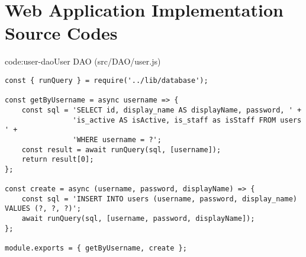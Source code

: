 \section{Web Application Implementation Source Codes}\label{sect:web-application-implementation-source-codes}

\begin{codeenv}{code:user-dao}{User DAO (src/DAO/user.js)}\begin{verbatim}
const { runQuery } = require('../lib/database');

const getByUsername = async username => {
    const sql = 'SELECT id, display_name AS displayName, password, ' +
                'is_active AS isActive, is_staff as isStaff FROM users ' +
                'WHERE username = ?';
    const result = await runQuery(sql, [username]);
    return result[0];
};

const create = async (username, password, displayName) => {
    const sql = 'INSERT INTO users (username, password, display_name) VALUES (?, ?, ?)';
    await runQuery(sql, [username, password, displayName]);
};

module.exports = { getByUsername, create };
\end{verbatim}
\end{codeenv}

